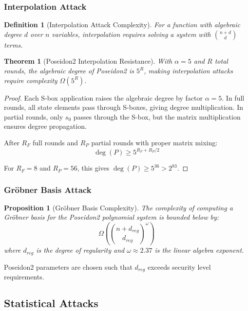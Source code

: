 \documentclass[11pt,a4paper]{article}
\newtheorem{theorem}{Theorem}
\newtheorem{definition}{Definition}
\newtheorem{proposition}{Proposition}
\begin{document}
\subsubsection{Interpolation Attack}

\begin{definition}[Interpolation Attack Complexity]
For a function with algebraic degree $d$ over $n$ variables, interpolation requires solving a system with $\binom{n+d}{d}$ terms.
\end{definition}

\begin{theorem}[Poseidon2 Interpolation Resistance]
With $\alpha = 5$ and $R$ total rounds, the algebraic degree of Poseidon2 is $5^R$, making interpolation attacks require complexity $\Omega(5^R)$.
\end{theorem}

\begin{proof}
Each S-box application raises the algebraic degree by factor $\alpha = 5$. In full rounds, all state elements pass through S-boxes, giving degree multiplication. In partial rounds, only $s_0$ passes through the S-box, but the matrix multiplication ensures degree propagation.

After $R_F$ full rounds and $R_P$ partial rounds with proper matrix mixing:
\[
\deg(P) \geq 5^{R_F + R_P/2}
\]

For $R_F = 8$ and $R_P = 56$, this gives $\deg(P) \geq 5^{36} > 2^{83}$.
\end{proof}

\subsubsection{Gröbner Basis Attack}

\begin{proposition}[Gröbner Basis Complexity]
The complexity of computing a Gröbner basis for the Poseidon2 polynomial system is bounded below by:
\[
\Omega\left( \binom{n + d_{reg}}{d_{reg}}^\omega \right)
\]
where $d_{reg}$ is the degree of regularity and $\omega \approx 2.37$ is the linear algebra exponent.
\end{proposition}

Poseidon2 parameters are chosen such that $d_{reg}$ exceeds security level requirements.

\subsection{Statistical Attacks}
\end{document}
